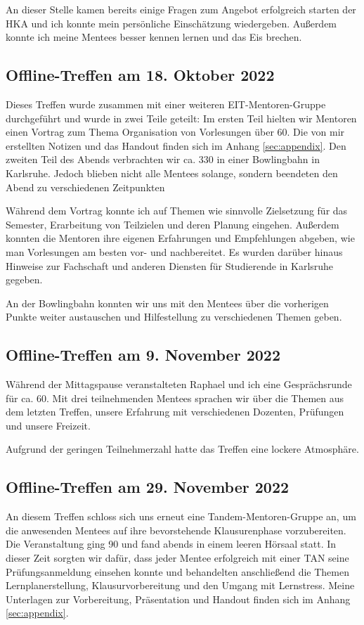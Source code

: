 \documentclass[
    paper=a4,
    div=calc,
    numbers=noendperiod,
    twocolumn,
]{scrartcl}
\newcommand{\gquotes}[1]{\glqq #1\grqq}
\begin{document}
        An dieser Stelle kamen bereits einige Fragen zum Angebot \gquotes{erfolgreich starten} der HKA und ich konnte mein persönliche Einschätzung wiedergeben. Außerdem konnte ich meine Mentees besser kennen lernen und das Eis brechen.

    \subsection{Offline-Treffen am 18. Oktober 2022}
        Dieses Treffen wurde zusammen mit einer weiteren EIT-Mentoren-Gruppe durchgeführt und wurde in zwei Teile geteilt: Im ersten Teil hielten wir Mentoren einen Vortrag zum Thema \gquotes{Organisation von Vorlesungen} über \SI{60}{\min}. Die von mir erstellten Notizen und das Handout finden sich im Anhang \ref{sec:appendix}. Den zweiten Teil des Abends verbrachten wir ca. \SI{330}{\min} in einer Bowlingbahn in Karlsruhe. Jedoch blieben nicht alle Mentees solange, sondern beendeten den Abend zu verschiedenen Zeitpunkten

        Während dem Vortrag konnte ich auf Themen wie sinnvolle Zielsetzung für das Semester, Erarbeitung von Teilzielen und deren Planung eingehen. Außerdem konnten die Mentoren ihre eigenen Erfahrungen und Empfehlungen abgeben, wie man Vorlesungen am besten vor- und nachbereitet. Es wurden darüber hinaus Hinweise zur Fachschaft und anderen Diensten für Studierende in Karlsruhe gegeben.

        An der Bowlingbahn konnten wir uns mit den Mentees über die vorherigen Punkte weiter austauschen und Hilfestellung zu verschiedenen Themen geben. 

    \subsection{Offline-Treffen am 9. November 2022}
        Während der Mittagspause veranstalteten Raphael und ich eine Gesprächsrunde für ca. \SI{60}{\min}. Mit drei teilnehmenden Mentees sprachen wir über die Themen aus dem letzten Treffen, unsere Erfahrung mit verschiedenen Dozenten, Prüfungen und unsere Freizeit.
        
        Aufgrund der geringen Teilnehmerzahl hatte das Treffen eine lockere Atmosphäre.

    \subsection{Offline-Treffen am 29. November 2022}
        An diesem Treffen schloss sich uns erneut eine Tandem-Mentoren-Gruppe an, um die anwesenden Mentees auf ihre bevorstehende Klausurenphase vorzubereiten. Die Veranstaltung ging \SI{90}{\min} und fand abends in einem leeren Hörsaal statt. In dieser Zeit sorgten wir dafür, dass jeder Mentee erfolgreich mit einer TAN seine Prüfungsanmeldung einsehen konnte und behandelten anschließend die Themen Lernplanerstellung, Klausurvorbereitung und den Umgang mit Lernstress. Meine Unterlagen zur Vorbereitung, Präsentation und Handout finden sich im Anhang \ref{sec:appendix}.
\end{document}
